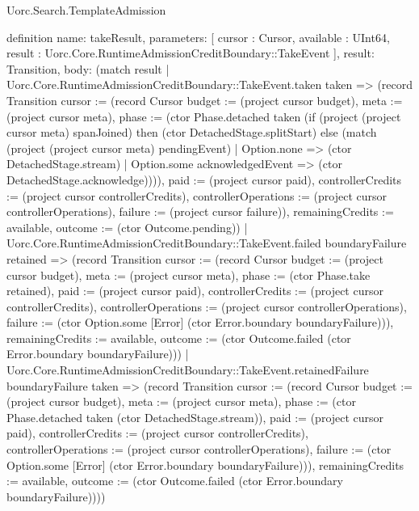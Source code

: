 \begin{lexlean}{Uorc.Search.TemplateAdmission}
\begin{semanticmodule}
definition{
  name: takeResult,
  parameters: [
    cursor : Cursor,
    available : UInt64,
    result : Uorc.Core.RuntimeAdmissionCreditBoundary::TakeEvent
  ],
  result: Transition,
  body: (match result
    | Uorc.Core.RuntimeAdmissionCreditBoundary::TakeEvent.taken taken => (record Transition {cursor := (record Cursor {budget := (project cursor budget), meta := (project cursor meta), phase := (ctor Phase.detached taken (if (project (project cursor meta) spanJoined) then (ctor DetachedStage.splitStart) else (match (project (project cursor meta) pendingEvent)
      | Option.none => (ctor DetachedStage.stream)
      | Option.some acknowledgedEvent => (ctor DetachedStage.acknowledge)))), paid := (project cursor paid), controllerCredits := (project cursor controllerCredits), controllerOperations := (project cursor controllerOperations), failure := (project cursor failure)}), remainingCredits := available, outcome := (ctor Outcome.pending)})
    | Uorc.Core.RuntimeAdmissionCreditBoundary::TakeEvent.failed boundaryFailure retained => (record Transition {cursor := (record Cursor {budget := (project cursor budget), meta := (project cursor meta), phase := (ctor Phase.take retained), paid := (project cursor paid), controllerCredits := (project cursor controllerCredits), controllerOperations := (project cursor controllerOperations), failure := (ctor Option.some [Error] (ctor Error.boundary boundaryFailure))}), remainingCredits := available, outcome := (ctor Outcome.failed (ctor Error.boundary boundaryFailure))})
    | Uorc.Core.RuntimeAdmissionCreditBoundary::TakeEvent.retainedFailure boundaryFailure taken => (record Transition {cursor := (record Cursor {budget := (project cursor budget), meta := (project cursor meta), phase := (ctor Phase.detached taken (ctor DetachedStage.stream)), paid := (project cursor paid), controllerCredits := (project cursor controllerCredits), controllerOperations := (project cursor controllerOperations), failure := (ctor Option.some [Error] (ctor Error.boundary boundaryFailure))}), remainingCredits := available, outcome := (ctor Outcome.failed (ctor Error.boundary boundaryFailure))}))
}


\end{semanticmodule}
\end{lexlean}
